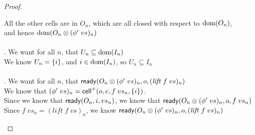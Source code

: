 \begin{proof}
\begin{enumerate}
\begin{tabbedproof}
  \ooo All the other cells are in $O_n$, which are all closed with respect to $\mbox{dom}({O_n})$, \\
  \oox and hence $\mbox{dom}({O_n \otimes (\phi'\;vs)_n})$  \\
  \\ . We want for all $n$, that $U_n \subseteq \mbox{dom}({I_n})$ \\
  \ooo We know $U_n = \{{i}\}$, and $i \in \mbox{dom}({I_n})$, so $U_n \subseteq I_n$ \\
  \\ . We want for all $n$, that $\mathsf{ready}({O_n \otimes (\phi'\;vs)_n}, {o}, {(\mathit{lift}\;f\;vs)_n})$ \\
  \ooo We know that $(\phi'\;vs)_n = \mathsf{cell}^{+}({o}, {e}, {f\;vs_n}, {\{{i}\}})$. \\
  \ooo Since we know that $\mathsf{ready}({O_n}, {i}, {vs_n})$, we know that $\mathsf{ready}({O_n \otimes (\phi'\;vs)_n}, {o}, {f\;vs_n})$ \\
  \ooo Since $f\;vs_n = (\mathit{lift}\;f\;vs)_n$, we know $\mathsf{ready}({O_n \otimes (\phi'\;vs)_n}, {o}, {(\mathit{lift}\;f\;vs)_n})$ \\


\end{tabbedproof}
\end{enumerate}
\end{proof}
